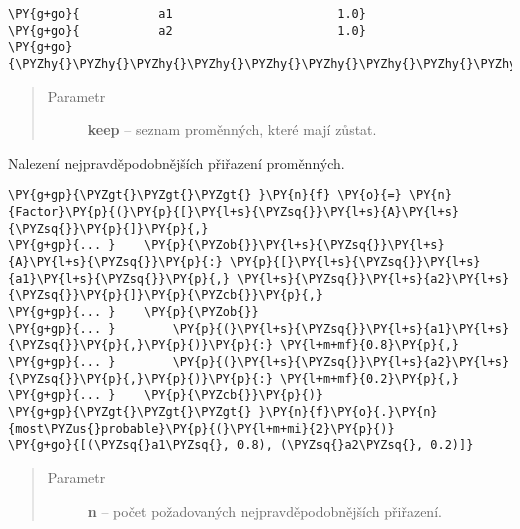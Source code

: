 \begin{fulllineitems}
\begin{fulllineitems}
\begin{Verbatim}[commandchars=\\\{\}]
\PY{g+go}{           a1                       1.0}
\PY{g+go}{           a2                       1.0}
\PY{g+go}{\PYZhy{}\PYZhy{}\PYZhy{}\PYZhy{}\PYZhy{}\PYZhy{}\PYZhy{}\PYZhy{}\PYZhy{}\PYZhy{}\PYZhy{}\PYZhy{}\PYZhy{}\PYZhy{}\PYZhy{}\PYZhy{}\PYZhy{}\PYZhy{}\PYZhy{}\PYZhy{}\PYZhy{}\PYZhy{}\PYZhy{}\PYZhy{}\PYZhy{}\PYZhy{}\PYZhy{}\PYZhy{}\PYZhy{}\PYZhy{}\PYZhy{}\PYZhy{}\PYZhy{}\PYZhy{}\PYZhy{}\PYZhy{}\PYZhy{}\PYZhy{}\PYZhy{}\PYZhy{}\PYZhy{}\PYZhy{}\PYZhy{}\PYZhy{}\PYZhy{}\PYZhy{}\PYZhy{}\PYZhy{}\PYZhy{}\PYZhy{}}
\end{Verbatim}
\begin{quote}\begin{description}
\item[{Parametr}] \leavevmode
\textbf{keep} -- seznam proměnných, které mají zůstat.

\end{description}\end{quote}

\end{fulllineitems}


\begin{fulllineitems}
\label{alex.infer:alex.infer.factor.Factor.most_probable}
Nalezení nejpravděpodobnějších přiřazení proměnných.

\begin{Verbatim}[commandchars=\\\{\}]
\PY{g+gp}{\PYZgt{}\PYZgt{}\PYZgt{} }\PY{n}{f} \PY{o}{=} \PY{n}{Factor}\PY{p}{(}\PY{p}{[}\PY{l+s}{\PYZsq{}}\PY{l+s}{A}\PY{l+s}{\PYZsq{}}\PY{p}{]}\PY{p}{,}
\PY{g+gp}{... }    \PY{p}{\PYZob{}}\PY{l+s}{\PYZsq{}}\PY{l+s}{A}\PY{l+s}{\PYZsq{}}\PY{p}{:} \PY{p}{[}\PY{l+s}{\PYZsq{}}\PY{l+s}{a1}\PY{l+s}{\PYZsq{}}\PY{p}{,} \PY{l+s}{\PYZsq{}}\PY{l+s}{a2}\PY{l+s}{\PYZsq{}}\PY{p}{]}\PY{p}{\PYZcb{}}\PY{p}{,}
\PY{g+gp}{... }    \PY{p}{\PYZob{}}
\PY{g+gp}{... }        \PY{p}{(}\PY{l+s}{\PYZsq{}}\PY{l+s}{a1}\PY{l+s}{\PYZsq{}}\PY{p}{,}\PY{p}{)}\PY{p}{:} \PY{l+m+mf}{0.8}\PY{p}{,}
\PY{g+gp}{... }        \PY{p}{(}\PY{l+s}{\PYZsq{}}\PY{l+s}{a2}\PY{l+s}{\PYZsq{}}\PY{p}{,}\PY{p}{)}\PY{p}{:} \PY{l+m+mf}{0.2}\PY{p}{,}
\PY{g+gp}{... }    \PY{p}{\PYZcb{}}\PY{p}{)}
\PY{g+gp}{\PYZgt{}\PYZgt{}\PYZgt{} }\PY{n}{f}\PY{o}{.}\PY{n}{most\PYZus{}probable}\PY{p}{(}\PY{l+m+mi}{2}\PY{p}{)}
\PY{g+go}{[(\PYZsq{}a1\PYZsq{}, 0.8), (\PYZsq{}a2\PYZsq{}, 0.2)]}
\end{Verbatim}
\begin{quote}\begin{description}
\item[{Parametr}] \leavevmode
\textbf{n} -- počet požadovaných nejpravděpodobnějších přiřazení.


\end{description}
\end{quote}
\end{fulllineitems}
\end{fulllineitems}
